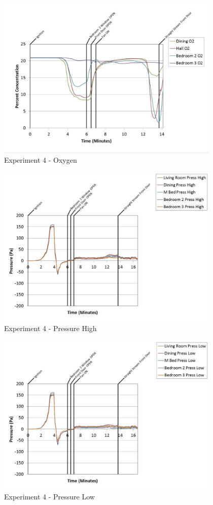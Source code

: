 \documentclass{article}
\begin{document}
\begin{appendices}
	\clearpage

	\begin{figure}[h!]
		\centering
		\includegraphics[height=3.05in]{0_Images/Results_Charts/Exp_4_Charts/Oxygen.pdf}
		\caption{Experiment 4 - Oxygen}
	\end{figure}
 

	\begin{figure}[h!]
		\centering
		\includegraphics[height=3.05in]{0_Images/Results_Charts/Exp_4_Charts/PressureHigh.pdf}
		\caption{Experiment 4 - Pressure High}
	\end{figure}
 
	\clearpage

	\begin{figure}[h!]
		\centering
		\includegraphics[height=3.05in]{0_Images/Results_Charts/Exp_4_Charts/PressureLow.pdf}
		\caption{Experiment 4 - Pressure Low}
	\end{figure}
 


\end{appendices}
\end{document}
